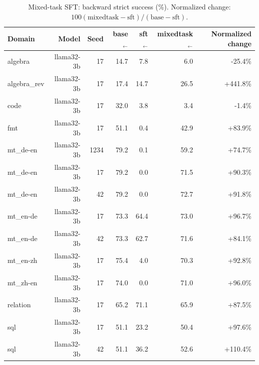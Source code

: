 \begin{table}[t]
\centering
\small
\begin{tabular}{lrrrrrr}
\toprule
Domain & Model & Seed & base$_\leftarrow$ & sft$_\leftarrow$ & mixedtask$_\leftarrow$ & Normalized change \\
\midrule
algebra & llama32-3b & 17 & 14.7 & 7.8 & 6.0 & -25.4\% \\
algebra\_rev & llama32-3b & 17 & 17.4 & 14.7 & 26.5 & +441.8\% \\
code & llama32-3b & 17 & 32.0 & 3.8 & 3.4 & -1.4\% \\
fmt & llama32-3b & 17 & 51.1 & 0.4 & 42.9 & +83.9\% \\
mt\_de-en & llama32-3b & 1234 & 79.2 & 0.1 & 59.2 & +74.7\% \\
mt\_de-en & llama32-3b & 17 & 79.2 & 0.0 & 71.5 & +90.3\% \\
mt\_de-en & llama32-3b & 42 & 79.2 & 0.0 & 72.7 & +91.8\% \\
mt\_en-de & llama32-3b & 17 & 73.3 & 64.4 & 73.0 & +96.7\% \\
mt\_en-de & llama32-3b & 42 & 73.3 & 62.7 & 71.6 & +84.1\% \\
mt\_en-zh & llama32-3b & 17 & 75.4 & 4.0 & 70.3 & +92.8\% \\
mt\_zh-en & llama32-3b & 17 & 74.0 & 0.0 & 71.0 & +96.0\% \\
relation & llama32-3b & 17 & 65.2 & 71.1 & 65.9 & +87.5\% \\
sql & llama32-3b & 17 & 51.1 & 23.2 & 50.4 & +97.6\% \\
sql & llama32-3b & 42 & 51.1 & 36.2 & 52.6 & +110.4\% \\
\bottomrule
\end{tabular}
\caption{Mixed-task SFT: backward strict success (\%). Normalized change: $100(\mathrm{mixedtask}-\mathrm{sft})/(\mathrm{base}-\mathrm{sft})$.}
\label{tab:mixture}
\end{table}